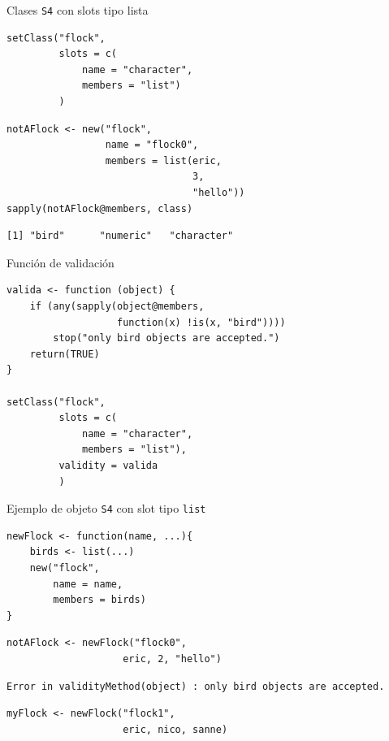 \documentclass[xcolor={usenames,svgnames,dvipsnames}]{beamer}
\begin{document}
\begin{frame}[label={sec:org32592ab},fragile]{Clases \texttt{S4} con slots tipo lista}
 \lstset{language=r,label= ,caption= ,captionpos=b,numbers=none}
\begin{lstlisting}
setClass("flock",
         slots = c(
             name = "character",
             members = "list")
         )

\end{lstlisting}

\lstset{language=r,label= ,caption= ,captionpos=b,numbers=none}
\begin{lstlisting}
notAFlock <- new("flock",
                 name = "flock0",
                 members = list(eric,
                                3,
                                "hello"))
sapply(notAFlock@members, class)
\end{lstlisting}

\begin{verbatim}
[1] "bird"      "numeric"   "character"
\end{verbatim}
\end{frame}

\begin{frame}[label={sec:org27b1456},fragile]{Función de validación}
 \lstset{language=r,label= ,caption= ,captionpos=b,numbers=none}
\begin{lstlisting}
valida <- function (object) {
    if (any(sapply(object@members,
                   function(x) !is(x, "bird")))) 
        stop("only bird objects are accepted.")
    return(TRUE)
}

setClass("flock",
         slots = c(
             name = "character",
             members = "list"),
         validity = valida
         )
\end{lstlisting}
\end{frame}

\begin{frame}[label={sec:org585e976},fragile]{Ejemplo de objeto \texttt{S4} con slot tipo \texttt{list}}
 \lstset{language=r,label= ,caption= ,captionpos=b,numbers=none}
\begin{lstlisting}
newFlock <- function(name, ...){
    birds <- list(...)
    new("flock",
        name = name,
        members = birds)
}
\end{lstlisting}

\lstset{language=r,label= ,caption= ,captionpos=b,numbers=none}
\begin{lstlisting}
notAFlock <- newFlock("flock0",
                    eric, 2, "hello")
\end{lstlisting}

\begin{verbatim}
Error in validityMethod(object) : only bird objects are accepted.
\end{verbatim}


\lstset{language=r,label= ,caption= ,captionpos=b,numbers=none}
\begin{lstlisting}
myFlock <- newFlock("flock1",
                    eric, nico, sanne)
\end{lstlisting}
\end{frame}
\end{document}
